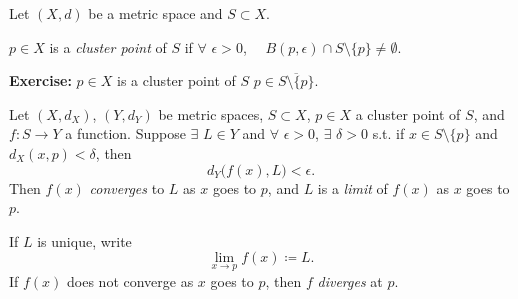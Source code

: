 \documentclass[10pt,aspectratio=149]{beamer}
\begin{document}
\begin{frame}

\begin{definition}
Let $(X,d)$ be a metric space and
$S \subset X$.

\pause
$p \in X$ is 
a \emph{cluster point} of $S$
if $\forall$ $\epsilon > 0$, ~~$B(p,\epsilon) \cap S
\setminus \{ p \} \not= \emptyset$.
\end{definition}

\pause
\textbf{Exercise:}
$p \in X$ is a cluster point of $S$  \wiffif $p \in \overline{S \setminus \{ p \}}$.

\pause
\medskip

\begin{definition}
Let $(X,d_X)$, $(Y,d_Y)$ be metric spaces, $S \subset X$, $p \in X$ a cluster point of $S$,
and $f \colon S \to Y$ a function.
\pause
Suppose $\exists$ $L \in Y$ and $\forall$ $\epsilon > 0$,
$\exists$ $\delta > 0$ s.t. if $x \in S \setminus \{ p \}$
and $d_X(x,p) < \delta$, then
\begin{equation*}
d_Y\bigl(f(x),L\bigr) < \epsilon .
\end{equation*}
\pause
Then $f(x)$
\emph{converges} to $L$ as $x$ goes to $p$,
\pause
and $L$ is a \emph{limit} of $f(x)$ as $x$ goes to $p$.

\pause
If $L$ is unique, write
\begin{equation*}
\lim_{x \to p} f(x) \coloneqq L .
\end{equation*}
\pause
If $f(x)$ does not converge as $x$ goes to $p$, then $f$
\emph{diverges} at $p$.
\end{definition}

\end{frame}
\end{document}
